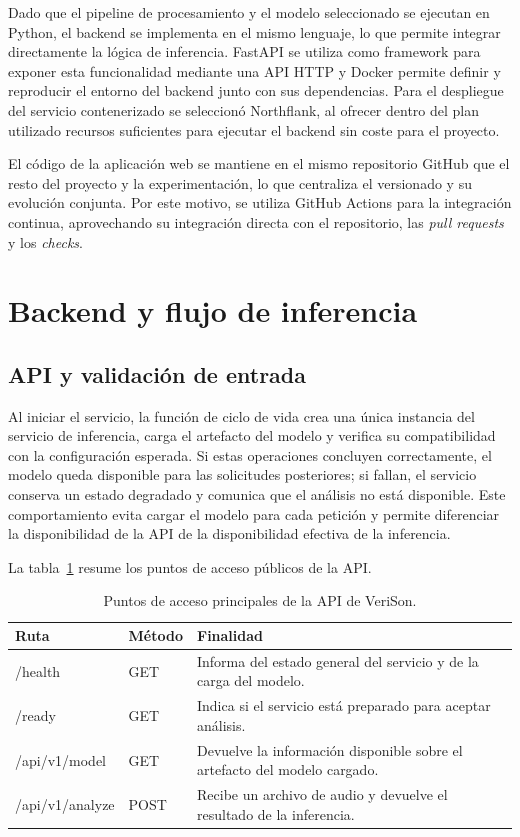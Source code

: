 Dado que el pipeline de procesamiento y el modelo seleccionado se ejecutan en Python, el backend se implementa en el mismo lenguaje, lo que permite integrar directamente la lógica de inferencia. FastAPI se utiliza como framework para exponer esta funcionalidad mediante una API HTTP y Docker permite definir y reproducir el entorno del backend junto con sus dependencias. Para el despliegue del servicio contenerizado se seleccionó Northflank, al ofrecer dentro del plan utilizado recursos suficientes para ejecutar el backend sin coste para el proyecto.

El código de la aplicación web se mantiene en el mismo repositorio GitHub que el resto del proyecto y la experimentación, lo que centraliza el versionado y su evolución conjunta. Por este motivo, se utiliza GitHub Actions para la integración continua, aprovechando su integración directa con el repositorio, las \textit{pull requests} y los \textit{checks}.

\section{Backend y flujo de inferencia}

\subsection{API y validación de entrada}

Al iniciar el servicio, la función de ciclo de vida crea una única instancia del servicio de inferencia, carga el artefacto del modelo y verifica su compatibilidad con la configuración esperada. Si estas operaciones concluyen correctamente, el modelo queda disponible para las solicitudes posteriores; si fallan, el servicio conserva un estado degradado y comunica que el análisis no está disponible. Este comportamiento evita cargar el modelo para cada petición y permite diferenciar la disponibilidad de la API de la disponibilidad efectiva de la inferencia.

La tabla~\ref{tab:endpoints-verison} resume los puntos de acceso públicos de la API.

\begin{table}[htbp]
    \centering
    \caption{Puntos de acceso principales de la API de VeriSon.}
    \label{tab:endpoints-verison}
    \begin{tabular}{p{}p{}p{}}
        \toprule
        \textbf{Ruta} & \textbf{Método} & \textbf{Finalidad} \\
        \midrule
        /health & GET & Informa del estado general del servicio y de la carga del modelo. \\
        /ready & GET & Indica si el servicio está preparado para aceptar análisis. \\
        /api/v1/model & GET & Devuelve la información disponible sobre el artefacto del modelo cargado. \\
        /api/v1/analyze & POST & Recibe un archivo de audio y devuelve el resultado de la inferencia. \\
        \bottomrule
    \end{tabular}
\end{table}

